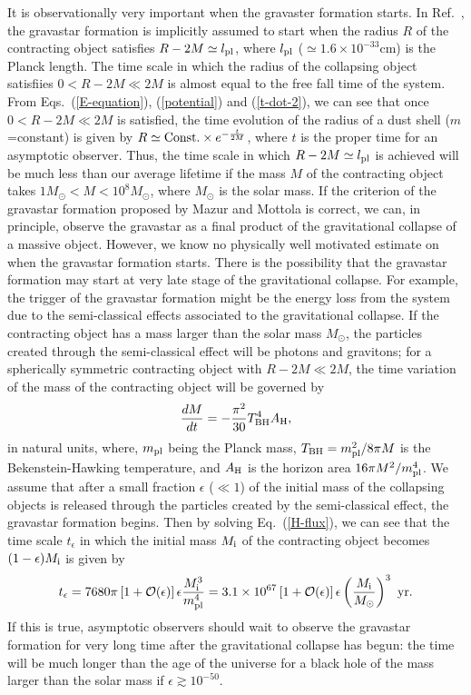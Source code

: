 \documentclass[aps,preprint,preprintnumber,nofootinbib,amsmath,amssymb,ascmac,bm,12pt]{revtex4}
\begin{document}
It is observationally very important when the gravaster formation starts. 
In Ref.~\cite{MM2004}, the gravastar formation is implicitly assumed to 
start when the radius $R$ of the contracting object satisfies $R-2M\simeq l_{\rm pl}$, where $l_{\rm pl}$ ($\simeq 1.6\times10^{-33}$cm) is the Planck length.  
The time scale in which the radius of the collapsing object satisfiies  $0<R-2M\ll 2M$ is almost equal to the free fall time of the system. 
From Eqs.~(\ref{E-equation}), (\ref{potential}) and (\ref{t-dot-2}), we can see that 
once $0<R-2M\ll 2M$ is satisfied, the time evolution of the radius of a dust shell ($m$=constant) is given by $R\simeq {\rm Const.}\times e^{-\frac{t}{2M}}$, 
where $t$ is the proper time for an asymptotic observer. 
Thus, the time scale in which $R-2M\simeq l_{\rm pl}$ is achieved  
will be much less than our average lifetime if the mass $M$ of the contracting object takes $1M_\odot <M<10^{8}M_\odot$, 
where $M_\odot$ is the solar mass. 
If the criterion of the gravastar formation proposed by Mazur and Mottola is correct, 
we can, in principle, observe the gravastar as a final product of the gravitational collapse of a massive object.  
However, we know no physically well motivated estimate on when the gravastar formation starts. There is the possibility 
that the gravastar formation may start at very late stage of the gravitational collapse. 
For example, the trigger of the gravastar formation might be the energy loss from the system 
due to the semi-classical effects associated to the gravitational collapse. 
If the contracting object has a mass larger than the solar mass $M_\odot$, the particles created through the semi-classical effect will be photons and gravitons; for a 
spherically symmetric contracting object with $R-2M \ll 2M$, the time variation of the mass of the contracting object will be governed by
\begin{equation}
\frac{dM}{dt}= -\frac{\pi^2}{30} T_{\rm BH}^4 A_{\rm H}, \label{H-flux}
\end{equation}
in natural units, where, $m_{\rm pl}$ being the Planck mass, $T_{\rm BH}=m_{\rm pl}^2/8\pi M$ is the Bekenstein-Hawking temperature, 
and $A_{\rm H}$ is the horizon area $16\pi M^2/m_{\rm pl}^4$\cite{PP}. We assume that after a small fraction $\epsilon$ ($\ll1$) of the initial mass of the collapsing 
objects is released through the particles created by the semi-classical effect, the gravastar formation begins. Then by solving Eq.~(\ref{H-flux}), we can see that 
the time scale $t_\epsilon$ in which the initial mass $M_{\rm i}$ of the 
contracting object becomes $(1-\epsilon)M_{\rm i}$ is given by$$
t_\epsilon=7680\pi \left[1+{\cal O}(\epsilon)\right]\epsilon\frac{M_{\rm i}^3}{m_{\rm pl}^4}=3.1\times 10^{67} \left[1+{\cal O}(\epsilon)\right]\epsilon\left(\frac{M_{\rm i}}{M_\odot}\right)^3 ~{\rm yr}.
$$
If this is true, asymptotic observers should wait to observe the gravastar formation for very long time after 
the gravitational collapse has begun: the time will be much longer than the age of the universe for a 
black hole of the mass larger than the solar mass if $\epsilon \gtrsim 10^{-50}$. 
\end{document}
